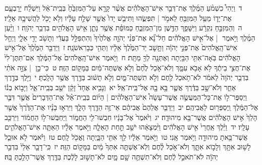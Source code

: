 \documentclass[18pt]{article}
\newcommand{\vart}[1]{\Bfootnote{#1}}	%
\begin{document}
 {\loc ד~}וַיְהִי֩ כִשְׁמֹ֨עַ הַמֶּ֜לֶךְ אֶת־דְּבַ֣ר אִישׁ־הָאֱלֹהִ֗ים אֲשֶׁ֨ר קָרָ֤א עַל־הַמִּזְבֵּ֙חַ֙ בְּבֵֽית־אֵ֔ל וַיִּשְׁלַ֨ח יָרׇבְעָ֧ם אֶת־יָד֛וֹ מֵעַ֥ל הַמִּזְבֵּ֖חַ לֵאמֹ֣ר  |  תִּפְשֻׂ֑הוּ וַתִּיבַ֤שׁ יָדוֹ֙ אֲשֶׁ֣ר שָׁלַ֣ח עָלָ֔יו וְלֹ֥א יָכֹ֖ל לַהֲשִׁיבָ֥הּ אֵלָֽיו׃ \startlock
 {\loc ה~}וְהַמִּזְבֵּ֣חַ נִקְרָ֔ע וַיִּשָּׁפֵ֥ךְ הַדֶּ֖שֶׁן מִן־הַמִּזְבֵּ֑חַ כַּמּוֹפֵ֗ת אֲשֶׁ֥ר נָתַ֛ן אִ֥ישׁ הָאֱלֹהִ֖ים בִּדְבַ֥ר יְהֹוָֽה׃ \startlock
 {\loc ו~}וַיַּ֨עַן הַמֶּ֜לֶךְ וַיֹּ֣אמֶר  |  אֶל־אִ֣ישׁ הָאֱלֹהִ֗ים חַל־נָ֞א אֶת־פְּנֵ֨י יְהֹוָ֤ה אֱלֹהֶ֙יךָ֙ וְהִתְפַּלֵּ֣ל בַּעֲדִ֔י וְתָשֹׁ֥ב יָדִ֖י אֵלָ֑י וַיְחַ֤ל אִישׁ־הָֽאֱלֹהִים֙ אֶת־פְּנֵ֣י יְהֹוָ֔ה וַתָּ֤שׇׁב יַד־הַמֶּ֙לֶךְ֙ אֵלָ֔יו וַתְּהִ֖י כְּבָרִאשֹׁנָֽה׃ \startlock
 {\loc ז~}וַיְדַבֵּ֤ר הַמֶּ֙לֶךְ֙ אֶל־אִ֣ישׁ הָאֱלֹהִ֔ים בֹּֽאָה־אִתִּ֥י הַבַּ֖יְתָה  \edtext{וּֽסְעָ֑דָה}{\vart{א=וּֽסֳעָ֑דָה | }}  וְאֶתְּנָ֥ה לְךָ֖ מַתָּֽת׃ \startlock
 {\loc ח~}וַיֹּ֤אמֶר אִישׁ־הָֽאֱלֹהִים֙ אֶל־הַמֶּ֔לֶךְ אִם־תִּתֶּן־לִי֙ אֶת־חֲצִ֣י בֵיתֶ֔ךָ לֹ֥א אָבֹ֖א עִמָּ֑ךְ וְלֹא־אֹ֤כַל לֶ֙חֶם֙ וְלֹ֣א אֶשְׁתֶּה־מַּ֔יִם בַּמָּק֖וֹם הַזֶּֽה׃ \startlock
 {\loc ט~}כִּי־כֵ֣ן  |  צִוָּ֣ה אֹתִ֗י בִּדְבַ֤ר יְהֹוָה֙ לֵאמֹ֔ר לֹא־תֹ֥אכַל לֶ֖חֶם וְלֹ֣א תִשְׁתֶּה־מָּ֑יִם וְלֹ֣א תָשׁ֔וּב בַּדֶּ֖רֶךְ אֲשֶׁ֥ר הָלָֽכְתָּ׃ \startlock
 {\loc י~}וַיֵּ֖לֶךְ בְּדֶ֣רֶךְ אַחֵ֑ר וְלֹא־שָׁ֣ב בַּדֶּ֔רֶךְ אֲשֶׁ֛ר בָּ֥א בָ֖הּ אֶל־בֵּֽית־אֵֽל׃ \startlock
 {\loc יא~}וְנָבִ֤יא אֶחָד֙ זָקֵ֔ן יֹשֵׁ֖ב בְּבֵֽית־אֵ֑ל וַיָּב֣וֹא בְנ֡וֹ וַיְסַפֶּר־ל֣וֹ אֶת־כׇּל־הַמַּעֲשֶׂ֣ה אֲשֶׁר־עָשָׂה֩ אִישׁ־הָאֱלֹהִ֨ים  |  הַיּ֜וֹם בְּבֵֽית־אֵ֗ל אֶת־הַדְּבָרִים֙ אֲשֶׁ֣ר דִּבֶּ֣ר אֶל־הַמֶּ֔לֶךְ וַֽיְסַפְּר֖וּם לַאֲבִיהֶֽם׃ \startlock
 {\loc יב~}וַיְדַבֵּ֤ר אֲלֵהֶם֙ אֲבִיהֶ֔ם אֵי־זֶ֥ה הַדֶּ֖רֶךְ הָלָ֑ךְ וַיִּרְא֣וּ בָנָ֗יו אֶת־הַדֶּ֙רֶךְ֙ אֲשֶׁ֤ר הָלַךְ֙ אִ֣ישׁ הָאֱלֹהִ֔ים אֲשֶׁר־בָּ֖א מִיהוּדָֽה׃ \startlock
 {\loc יג~}וַיֹּ֙אמֶר֙ אֶל־בָּנָ֔יו חִבְשׁוּ־לִ֖י הַחֲמ֑וֹר וַיַּחְבְּשׁוּ־ל֣וֹ הַחֲמ֔וֹר וַיִּרְכַּ֖ב עָלָֽיו׃ \startlock
 {\loc יד~}וַיֵּ֗לֶךְ אַֽחֲרֵי֙ אִ֣ישׁ הָאֱלֹהִ֔ים וַיִּ֨מְצָאֵ֔הוּ יֹשֵׁ֖ב תַּ֣חַת הָאֵלָ֑ה וַיֹּ֣אמֶר אֵלָ֗יו הַאַתָּ֧ה אִישׁ־הָאֱלֹהִ֛ים אֲשֶׁר־בָּ֥אתָ מִיהוּדָ֖ה וַיֹּ֥אמֶר אָֽנִי׃ \startlock
 {\loc טו~}וַיֹּ֣אמֶר אֵלָ֔יו לֵ֥ךְ אִתִּ֖י הַבָּ֑יְתָה וֶאֱכֹ֖ל לָֽחֶם׃ \startlock
 {\loc טז~}וַיֹּ֗אמֶר לֹ֥א אוּכַ֛ל לָשׁ֥וּב אִתָּ֖ךְ וְלָב֣וֹא אִתָּ֑ךְ וְלֹא־אֹ֣כַל לֶ֗חֶם וְלֹֽא־אֶשְׁתֶּ֤ה אִתְּךָ֙ מַ֔יִם בַּמָּק֖וֹם הַזֶּֽה׃ \startlock
 {\loc יז~}כִּֽי־דָבָ֤ר אֵלַי֙ בִּדְבַ֣ר יְהֹוָ֔ה לֹא־תֹאכַ֣ל לֶ֔חֶם וְלֹא־תִשְׁתֶּ֥ה שָׁ֖ם מָ֑יִם לֹא־תָשׁ֣וּב לָלֶ֔כֶת בַּדֶּ֖רֶךְ אֲשֶׁר־הָלַ֥כְתָּ בָּֽהּ׃ \startlock
\end{document}
